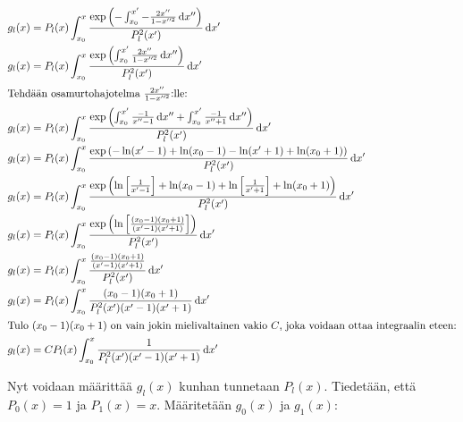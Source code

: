 \documentclass[../johdoksia.tex]{subfiles}
\begin{document}
	\begin{align*}
		g_l(x) &= P_l(x)\int_{x_0}^{x}\frac{\exp\left(-\int_{x_0}^{x'}-\frac{2x''}{1 - x''^2}\odif{x''}\right)}{P_l^2(x')}\odif{x'} \\
		g_l(x) &= P_l(x)\int_{x_0}^{x}\frac{\exp\left(\int_{x_0}^{x'}\frac{2x''}{1 - x''^2}\odif{x''}\right)}{P_l^2(x')}\odif{x'} \\
		\intertext{Tehdään osamurtohajotelma $\frac{2x''}{1 - x''^2}$:lle:}
		g_l(x) &= P_l(x)\int_{x_0}^{x}\frac{\exp\left(\int_{x_0}^{x'}\frac{-1}{x'' - 1}\odif{x''} + \int_{x_0}^{x'}\frac{-1}{x'' + 1}\odif{x''}\right)}{P_l^2(x')}\odif{x'} \\
		g_l(x) &= P_l(x)\int_{x_0}^{x}\frac{\exp\left(-\ln(x' - 1) + \ln(x_0 - 1) - \ln(x' + 1) + \ln(x_0 + 1)\right)}{P_l^2(x')}\odif{x'} \\
		g_l(x) &= P_l(x)\int_{x_0}^{x}\frac{\exp\left(\ln\left[\frac{1}{x' - 1}\right] + \ln(x_0 - 1) + \ln\left[\frac{1}{x' + 1}\right] + \ln(x_0 + 1)\right)}{P_l^2(x')}\odif{x'} \\
		g_l(x) &= P_l(x)\int_{x_0}^{x}\frac{\exp\left(\ln\left[\frac{(x_0 - 1)(x_0 + 1)}{(x' - 1)(x' + 1)}\right]\right)}{P_l^2(x')}\odif{x'} \\
		g_l(x) &= P_l(x)\int_{x_0}^{x}\frac{\frac{(x_0 - 1)(x_0 + 1)}{(x' - 1)(x' + 1)}}{P_l^2(x')}\odif{x'} \\
		g_l(x) &= P_l(x)\int_{x_0}^{x}\frac{(x_0 - 1)(x_0 + 1)}{P_l^2(x')(x' - 1)(x' + 1)}\odif{x'} \\
		\intertext{Tulo $(x_0 - 1)(x_0 + 1)$ on vain jokin mielivaltainen vakio $C$, joka voidaan ottaa integraalin eteen:}
		g_l(x) &= CP_l(x)\int_{x_0}^{x}\frac{1}{P_l^2(x')(x' - 1)(x' + 1)}\odif{x'}
	\end{align*}

	Nyt voidaan määrittää $g_l(x)$ kunhan tunnetaan $P_l(x)$. Tiedetään, että $P_0(x) = 1$ ja $P_1(x) = x$. Määritetään $g_0(x)$ ja $g_1(x)$:
	
\end{document}
